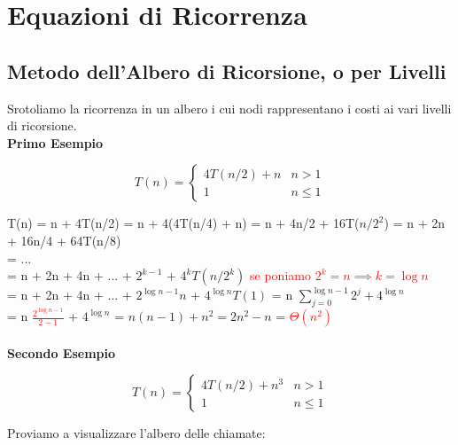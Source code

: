 \documentclass[../cheatSheetAlgoritmi.tex]{subfiles}
\begin{document}
\section{Equazioni di Ricorrenza}
\subsection{Metodo dell'Albero di Ricorsione, o per Livelli}
Srotoliamo la ricorrenza in un albero i cui nodi rappresentano i costi ai vari livelli di ricorsione.\\
\textbf{Primo Esempio}
\begin{center}
	\begin{equation*}
  		T(n)=\begin{cases}
    		4T(n/2) + n & \text{$n > 1$}\\
    		1 & \text{$n \leq 1$}
  		\end{cases}
	\end{equation*}
\end{center}
T(n) = n + 4T(n/2) = n + 4(4T(n/4) + n) = n + 4n/2 + 16T($n/2^{2}$) = n + 2n + 16n/4 + 64T(n/8)\\
= ...\\
= n + 2n + 4n + ... + $2^{k-1}$ + $4^{k}T(n/2^{k})$ \textcolor{red}{se poniamo $2^{k} = n \implies k = \log{n}$}\\
= n + 2n + 4n + ... + $2^{\log{n-1}}n$ + $4^{\log{n}}T(1)$ = n $\sum\limits_{j=0}^{\log{n-1}} {2^{j}} + 4^{\log{n}}$\\
= n \textcolor{red}{$\frac{2^{\log{n}-1}}{2-1}$} + $ 4^{\log{n}}$ = $n(n-1) + n^{2} = 2n^{2} - n$ = \textcolor{red}{$\Theta(n^{2})$}\\\\
\textbf{Secondo Esempio}
\begin{center}
	\begin{equation*}
  		T(n)=\begin{cases}
    		4T(n/2) + n^{3} & \text{$n > 1$}\\
    		1 & \text{$n \leq 1$}
  		\end{cases}
	\end{equation*}
\end{center}

Proviamo a visualizzare l'albero delle chiamate:
\end{document}

